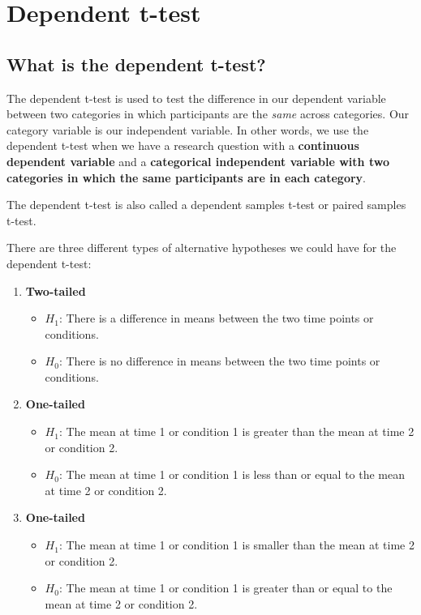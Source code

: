 \documentclass[
]{book}
\providecommand{\tightlist}{%
  \setlength{\itemsep}{0pt}\setlength{\parskip}{0pt}}
\begin{document}
\hypertarget{dependent-t-test}{%
\chapter{Dependent t-test}\label{dependent-t-test}}

\hypertarget{what-is-the-dependent-t-test}{%
\section{What is the dependent t-test?}\label{what-is-the-dependent-t-test}}

The dependent t-test is used to test the difference in our dependent variable between two categories in which participants are the \emph{same} across categories. Our category variable is our independent variable. In other words, we use the dependent t-test when we have a research question with a \textbf{continuous dependent variable} and a \textbf{categorical independent variable with two categories in which the same participants are in each category}.

The dependent t-test is also called a dependent samples t-test or paired samples t-test.

There are three different types of alternative hypotheses we could have for the dependent t-test:

\begin{enumerate}
\def\labelenumi{\arabic{enumi}.}
\item
  \textbf{Two-tailed}

  \begin{itemize}
  \tightlist
  \item
    \(H_1\): There is a difference in means between the two time points or conditions.
  \item
    \(H_0\): There is no difference in means between the two time points or conditions.
  \end{itemize}
\item
  \textbf{One-tailed}

  \begin{itemize}
  \tightlist
  \item
    \(H_1\): The mean at time 1 or condition 1 is greater than the mean at time 2 or condition 2.
  \item
    \(H_0\): The mean at time 1 or condition 1 is less than or equal to the mean at time 2 or condition 2.
  \end{itemize}
\item
  \textbf{One-tailed}

  \begin{itemize}
  \tightlist
  \item
    \(H_1\): The mean at time 1 or condition 1 is smaller than the mean at time 2 or condition 2.
  \item
    \(H_0\): The mean at time 1 or condition 1 is greater than or equal to the mean at time 2 or condition 2.
  \end{itemize}
\end{enumerate}
\end{document}
